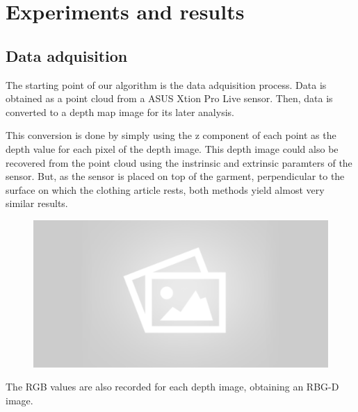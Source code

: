 \chapter{Experiments and results}
\label{experiments_and_results}



\section{Data adquisition}
\label{data_adquisition}

The starting point of our algorithm is the data adquisition process. Data is obtained as a point cloud from a ASUS Xtion Pro Live sensor. Then, data is converted to a depth map image for its later analysis. 

This conversion is done by simply using the z component of each point as the depth value for each pixel of the depth image. This depth image could also be recovered from the point cloud using the instrinsic and extrinsic paramters of the sensor. But, as the sensor is placed on top of the garment, perpendicular to the surface on which the clothing article rests, both methods yield almost very similar results.

\begin{figure}[thpb]
    \centering
    \includegraphics[width=0.7
    \textwidth]{figures/placeholder2.png}
    \caption{}
    \label{fig:point_cloud_and_depth_image}
\end{figure}

The RGB values are also recorded for each depth image, obtaining an RBG-D image.



